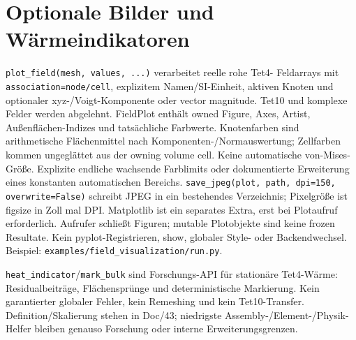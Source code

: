 \section{Optionale Bilder und Wärmeindikatoren}
\texttt{plot\_field(mesh, values, ...)} verarbeitet reelle rohe Tet4-
Feldarrays mit \texttt{association=node/cell}, explizitem Namen/SI-Einheit,
aktiven Knoten und optionaler xyz-/Voigt-Komponente oder vector magnitude.
Tet10 und komplexe Felder werden abgelehnt. FieldPlot enthält owned Figure,
Axes, Artist, Außenflächen-Indizes und tatsächliche Farbwerte.
Knotenfarben sind arithmetische Flächenmittel nach Komponenten-/Normauswertung;
Zellfarben kommen ungeglättet aus der owning volume cell. Keine automatische
von-Mises-Größe. Explizite endliche wachsende Farblimits oder dokumentierte
Erweiterung eines konstanten automatischen Bereichs.
\texttt{save\_jpeg(plot, path, dpi=150, overwrite=False)} schreibt JPEG in
ein bestehendes Verzeichnis; Pixelgröße ist figsize in Zoll mal DPI.
Matplotlib ist ein separates Extra, erst bei Plotaufruf erforderlich.
Aufrufer schließt Figuren; mutable Plotobjekte sind keine frozen Resultate.
Kein pyplot-Registrieren, show, globaler Style- oder Backendwechsel.
Beispiel: \nolinkurl{examples/field_visualization/run.py}.

\texttt{heat\_indicator}/\texttt{mark\_bulk} sind Forschungs-API für stationäre
Tet4-Wärme: Residualbeiträge, Flächensprünge und deterministische Markierung.
Kein garantierter globaler Fehler, kein Remeshing und kein Tet10-Transfer.
Definition/Skalierung stehen in Doc/43; niedrigste Assembly-/Element-/Physik-
Helfer bleiben genauso Forschung oder interne Erweiterungsgrenzen.
\endgroup

